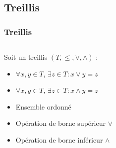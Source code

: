 \documentclass{beamer}
\begin{document}
\subsection{Treillis}

\begin{frame}
	\frametitle{Treillis}
	\begin{columns}[T]
		\begin{column}{.6\textwidth}
			\begin{definition}
				Soit un treillis $(T, \leq, \vee, \wedge)$ :
				\begin{itemize}
					\item $\forall x, y \in T$, $\exists z \in T : x \vee y = z$
					\item $\forall x, y \in T$, $\exists z \in T : x \wedge y = z$
				\end{itemize}
			\end{definition}
			\begin{itemize}
				\item Ensemble ordonné
				\item Opération de borne supérieur $\vee$
				\item Opération de borne inférieur $\wedge$
			\end{itemize}
		\end{column}
		\begin{column}{.3\textwidth}
		\end{column}
	\end{columns}
\end{frame}
\end{document}
